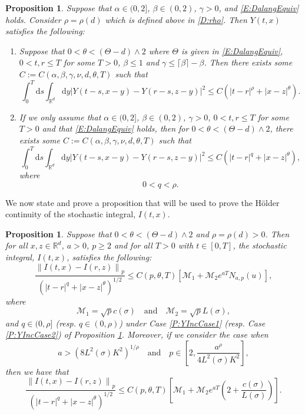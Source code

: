 \documentclass[12pt]{report}
\theoremstyle{plain}
\newtheorem{proposition}[theorem]{Proposition}
\theoremstyle{definition}
\numberwithin{equation}{section}
\newcommand{\R}{\mathbb{R}}
\newcommand{\Norm}[1]{\left\|  #1   \right\|}
\newcommand{\ud}{\ensuremath{ \mathrm{d} }}
\begin{document}
\begin{proposition}{\normalfont\cite[Propositions 2.1 and 2.2]{chen.hu:21:holder}}
	\label{P:YInc}
	Suppose that $\alpha \in (0,2]$, $\beta \in (0,2)$, $\gamma>0$, and \eqref{E:DalangEquiv} holds. Consider $\rho = \rho(d)$ which is defined above in \eqref{D:rho}. Then $Y(t,x)$ satisfies the following:
	\begin{enumerate}
		\item \label{P:YIncCase1}  Suppose that $0< \theta < (\Theta -d) \wedge 2$ where $\Theta$ is given in \eqref{E:DalangEquiv}, $0< t,r \le T$ for some $T>0$, $\beta \le 1$ and $\gamma \le \lceil \beta \rceil - \beta$. Then there exists some $C := C(\alpha, \beta, \gamma, \nu, d, \theta, T)$ such that
		\[
		\int_0^T \ud s \int_{\R^d} \ud y |Y(t-s,x-y) - Y(r-s,z-y)|^2 \le C \left(|t-r|^\rho + |x-z|^{\theta}\right).
		\]
		\item \label{P:YIncCase2} If we only assume that $\alpha \in (0,2]$, $\beta \in (0,2)$, $\gamma>0$, $0< t,r \le T$ for some $T>0$ and that \eqref{E:DalangEquiv} holds, then for $0< \theta < (\Theta -d) \wedge 2$, there exists some $C := C(\alpha, \beta, \gamma, \nu, d, \theta, T)$ such that
		\[
		\int_0^T \ud s \int_{\R^d} \ud y |Y(t-s,x-y) - Y(r-s,z-y)|^2 \le C \left(|t-r|^q + |x-z|^{\theta}\right),
		\]
		where 
		\[
		0 < q < \rho.
		\]
	\end{enumerate}
\end{proposition}

We now state and prove a proposition that will be used to prove the H\"older continuity of the stochastic integral, $I(t,x)$.

\begin{proposition}
	\label{P:NormInc}
	Suppose that $0< \theta < (\Theta -d) \wedge 2$ and $\rho = \rho(d) > 0$. Then for all $x,z \in \R^d$, $a>0$, $p\ge 2$ and for all $T>0$ with $t\in [0,T]$, the stochastic integral, $I(t,x)$, satisfies the following:
	\begin{equation}
	\label{E:NormInc_N(u)}
	\frac{\Norm{I(t,x)-I(r,z)}_p}{\left(|t-r|^{q} + |x-z|^{\theta}\right)^{1/2}} \le 	C(p,\theta, T)\left[ \mathcal{M}_1 + \mathcal{M}_2 e^{aT} N_{a,p}(u)\right] ,
	\end{equation}
	where 
	\[
	\mathcal{M}_1 = \sqrt{p}c(\sigma) \quad \text{and} \quad\mathcal{M}_2 =\sqrt{p}L(\sigma),
	\]
	and $q \in (0, \rho]$ (resp. $q \in (0, \rho)$) under Case \ref{P:YIncCase1} (resp. Case \ref{P:YIncCase2}) of Proposition \ref{P:YInc}. Moreover, if we consider the case when 
	\[
	a > \left( 8 L^2(\sigma)K^2\right)^{1/
		\rho}
	\quad \text{and} \quad
	p \in \left[ 2, \frac{a^{\rho}}{4L^2(\sigma)K^2} \right],
	\]
	then we have that 
	\begin{equation}
	\label{E:NormInc_cL}
	\frac{\Norm{I(t,x)-I(r,z)}_p}{\left(|t-r|^{q} + |x-z|^{\theta}\right)^{1/2}} \le C(p,\theta, T)\left[ \mathcal{M}_1 + \mathcal{M}_2 e^{aT} \left( 2 +  \frac{c(\sigma)}{L(\sigma)} \right)\right].
	\end{equation}
\end{proposition}
\end{document}
